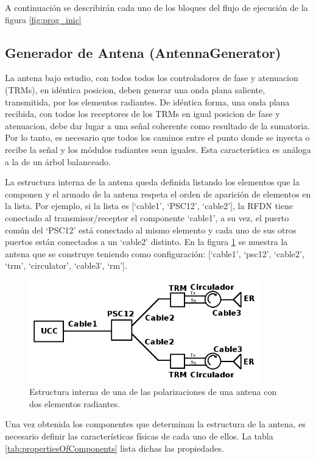 A continuación se describirán cada uno de los bloques del flujo de ejecución de la figura \ref{fig:prog_inic}

\subsection{Generador de Antena (AntennaGenerator)}

La antena bajo estudio, con todos todos los controladores de fase y atenuacion (TRMs), en idéntica posicion, deben generar una
onda plana saliente, transmitida, por los elementos radiantes. De idéntica forma, una onda plana recibida, con todos los
receptores de los TRMs en igual posicion de fase y atenuacion, debe dar lugar a una señal coherente como resultado de la
sumatoria. Por lo tanto, es necesario que todos los caminos entre el punto donde se inyecta o recibe la señal y los módulos 
radiantes sean iguales. Esta característica es análoga a la de un árbol balanceado. 

La estructura interna de la antena queda definida listando los elementos que la componen y el armado de la antena respeta el
orden de aparición de elementos en la lista. Por ejemplo, si la lista es [\enquote*{cable1}, \enquote*{PSC12},
\enquote*{cable2}], la RFDN tiene conectado al transmisor/receptor el componente \enquote*{cable1}, a su vez, el puerto común
del \enquote*{PSC12} está conectado al mismo elemento y cada uno de sus otros puertos están conectados a un \enquote*{cable2}
distinto. En la figura \ref{fig:2RMAntenna} se muestra la antena que se construye teniendo como configuración:
[\enquote*{cable1}, \enquote*{psc12}, \enquote*{cable2}, \enquote*{trm}, \enquote*{circulator}, \enquote*{cable3},
\enquote*{rm}].

\begin{figure}
 \centering
 \includegraphics[width=10cm]{gfx/RFDN.png}
 \caption{Estructura interna de una de las polarizaciones de una antena con dos elementos radiantes.}
 \label{fig:2RMAntenna}
\end{figure}

Una vez obtenida los componentes que determinan la estructura de la antena, es necesario definir las características físicas de
cada uno de ellos. La tabla \ref{tab:propertiesOfComponents} lista dichas las propiedades.

